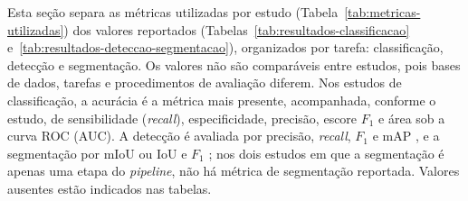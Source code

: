 Esta seção separa as métricas utilizadas por estudo (Tabela~\ref{tab:metricas-utilizadas}) dos valores
reportados (Tabelas~\ref{tab:resultados-classificacao} e~\ref{tab:resultados-deteccao-segmentacao}),
organizados por tarefa: classificação, detecção e segmentação. Os valores não são comparáveis entre
estudos, pois bases de dados, tarefas e procedimentos de avaliação diferem. Nos estudos de classificação, a
acurácia é a métrica mais presente, acompanhada, conforme o estudo, de sensibilidade (\textit{recall}),
especificidade, precisão, escore $F_1$ e área sob a curva ROC (AUC). A detecção é avaliada por precisão,
\textit{recall}, $F_1$ e mAP , e a segmentação por mIoU ou IoU e $F_1$
; nos dois estudos em que a segmentação é apenas uma etapa do
\textit{pipeline}, não há métrica de segmentação reportada. Valores ausentes estão indicados nas tabelas.

